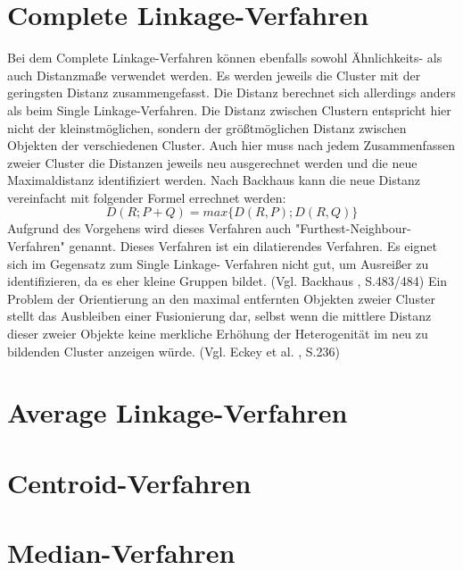 \section{Complete Linkage-Verfahren}
Bei dem Complete Linkage-Verfahren können ebenfalls sowohl Ähnlichkeits- als auch Distanzmaße verwendet werden. Es werden jeweils die Cluster mit der geringsten Distanz zusammengefasst. Die Distanz berechnet sich allerdings anders als beim Single Linkage-Verfahren. Die Distanz zwischen Clustern entspricht hier nicht der kleinstmöglichen, sondern der größtmöglichen Distanz zwischen Objekten der verschiedenen Cluster. Auch hier muss nach jedem Zusammenfassen zweier Cluster die Distanzen jeweils neu ausgerechnet werden und die neue Maximaldistanz identifiziert werden.
Nach Backhaus \cite{Backhaus.2016} kann die neue Distanz vereinfacht mit folgender Formel errechnet werden:                                                                                                                                                                                                                                                                                                                                                                                  
\begin{equation}
D(R;P+Q) = max\{D(R,P);D(R,Q)\}
\end{equation}
Aufgrund des Vorgehens wird dieses Verfahren auch "Furthest-Neighbour-Verfahren" genannt.
Dieses Verfahren ist ein dilatierendes Verfahren. Es eignet sich im Gegensatz zum Single Linkage- Verfahren nicht gut, um Ausreißer zu identifizieren, da es eher kleine Gruppen bildet. (Vgl. Backhaus \cite{Backhaus.2016}, S.483/484) Ein Problem der Orientierung an den maximal entfernten Objekten zweier Cluster stellt das Ausbleiben einer Fusionierung dar, selbst wenn die mittlere Distanz dieser zweier Objekte keine merkliche Erhöhung der Heterogenität im neu zu bildenden Cluster anzeigen würde. (Vgl. Eckey et al. \cite{Eckey.2002}, S.236)

\section{Average Linkage-Verfahren}
\section{Centroid-Verfahren}
\section{Median-Verfahren}
